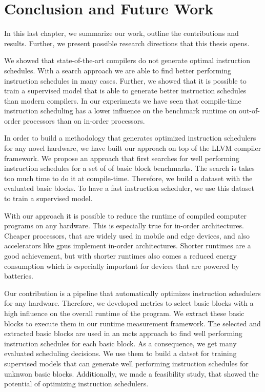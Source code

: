 \chapter{Conclusion and Future Work}
\label{sec:conclusion}
In this last chapter, we summarize our work, outline the contributions and results.
Further, we present possible research directions that this thesis opens.

We showed that state-of-the-art compilers do not generate optimal instruction schedules.
With a search approach we are able to find better performing instruction schedules in many cases.
Further, we showed that it is possible to train a supervised model that is able to generate better instruction schedules than modern compilers.
In our experiments we have seen that compile-time instruction scheduling has a lower influence on the benchmark runtime on out-of-order processors than on in-order processors.

In order to build a methodology that generates optimized instruction schedulers for any novel hardware, we have built our approach on top of the LLVM compiler framework.
We propose an approach that first searches for well performing instruction schedules for a set of of basic block benchmarks.
The search is takes too much time to do it at compile-time.
Therefore, we build a dataset with the evaluated basic blocks.
To have a fast instruction scheduler, we use this dataset to train a supervised model.

With our approach it is possible to reduce the runtime of compiled computer programs on any hardware.
This is especially true for in-order architectures.
Cheaper processors, that are widely used in mobile and edge devices, and also accelerators like \acp{gpu} implement in-order architectures.
Shorter runtimes are a good achievement, but with shorter runtimes also comes a reduced energy consumption which is especially important for devices that are powered by batteries.

Our contribution is a pipeline that automatically optimizes instruction schedulers for any hardware.
Therefore, we developed metrics to select basic blocks with a high influence on the overall runtime of the program.
We extract these basic blocks to execute them in our runtime measurement framework.
The selected and extracted basic blocks are used in an \ac{mcts} approach to find well performing instruction schedules for each basic block.
As a consequence, we get many evaluated scheduling decisions.
We use them to build a datset for training supervised models that can generate well performing instruction schedules for unknwon basic blocks.
Additionally, we made a feasibility study, that showed the potential of optimizing instruction schedulers.

